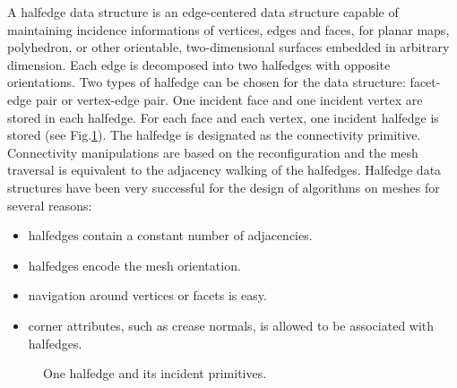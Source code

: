 A halfedge data structure \cite{Weiler:1985:EDS} is an edge-centered data
structure capable of maintaining incidence informations of vertices,
edges and faces, for planar maps, polyhedron, or other orientable,
two-dimensional surfaces embedded in arbitrary dimension. Each edge is
decomposed into two halfedges with opposite orientations.  Two types
of halfedge can be chosen for the data structure: facet-edge pair or
vertex-edge pair. One incident face and one incident vertex are
stored in each halfedge. For each face and each vertex, one incident
halfedge is stored (see Fig.\ref{fig:halfedge}). The halfedge is
designated as the connectivity primitive. Connectivity manipulations
are based on the reconfiguration and the mesh traversal is equivalent
to the adjacency walking of the halfedges. Halfedge data structures
have been very successful for the design of algorithms on meshes for
several reasons:
\begin{itemize}
\item halfedges contain a constant number of adjacencies. 
\item halfedges encode the mesh orientation.
\item navigation around vertices or facets is easy.
\item corner attributes, such as crease normals, is allowed 
      to be associated with halfedges.
\end{itemize}

\begin{figure}[htb]
    \caption{One halfedge and its incident primitives.}
    \label{fig:halfedge}
\end{figure}


